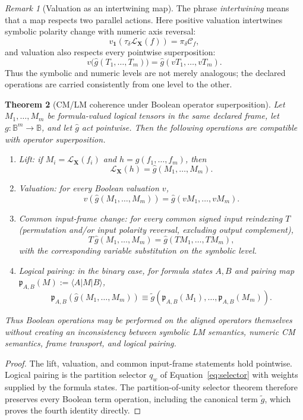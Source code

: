\documentclass[11pt]{article}
\newtheorem{theorem}{Theorem}[section]
\theoremstyle{definition}
\theoremstyle{remark}
\newtheorem{remark}[theorem]{Remark}
\newcommand{\B}{\mathbb B}
\newcommand{\cC}{\mathcal C}
\begin{document}
\begin{remark}[Valuation as an intertwining map]
The phrase \emph{intertwining} means that a map respects two parallel actions.  Here positive valuation intertwines symbolic polarity change with numeric axis reversal:
\[
 v_{\mathbf1}\!\left(\tau_\delta\mathcal L_{\mathbf X}(f)\right)
 =\pi_\delta\cC_f,
\]
and valuation also respects every pointwise superposition:
\[
 v\bigl(\widehat g(T_1,\ldots,T_m)\bigr)
 =\widehat g(vT_1,\ldots,vT_m).
\]
Thus the symbolic and numeric levels are not merely analogous; the declared operations are carried consistently from one level to the other.
\end{remark}

\begin{theorem}[CM/LM coherence under Boolean operator superposition]
\label{thm:coherence}
Let $M_1,\ldots,M_m$ be formula-valued logical tensors in the same declared frame, let $g:\B^m\to\B$, and let $\widehat g$ act pointwise.  Then the following operations are compatible with operator superposition.
\begin{enumerate}
\item \emph{Lift:} if $M_i=\mathcal L_{\mathbf X}(f_i)$ and $h=g(f_1,\ldots,f_m)$, then
\[
 \mathcal L_{\mathbf X}(h)=\widehat g(M_1,\ldots,M_m).
\]
\item \emph{Valuation:} for every Boolean valuation $v$,
\[
 v\!\left(\widehat g(M_1,\ldots,M_m)\right)
 =\widehat g(vM_1,\ldots,vM_m).
\]
\item \emph{Common input-frame change:} for every common signed input reindexing $T$ (permutation and/or input polarity reversal, excluding output complement),
\[
 T\,\widehat g(M_1,\ldots,M_m)
 =\widehat g(TM_1,\ldots,TM_m),
\]
with the corresponding variable substitution on the symbolic level.
\item \emph{Logical pairing:} in the binary case, for formula states $A,B$ and pairing map $\mathfrak p_{A,B}(M):=\langle A|M|B\rangle$,
\[
 \mathfrak p_{A,B}\!\left(\widehat g(M_1,\ldots,M_m)\right)
 \equiv
 \widetilde g\!\left(\mathfrak p_{A,B}(M_1),\ldots,\mathfrak p_{A,B}(M_m)\right).
\]
\end{enumerate}
Thus Boolean operations may be performed on the aligned operators themselves without creating an inconsistency between symbolic LM semantics, numeric CM semantics, frame transport, and logical pairing.
\end{theorem}
\begin{proof}
The lift, valuation, and common input-frame statements hold pointwise.  Logical pairing is the partition selector $q_w$ of Equation~\eqref{eq:selector} with weights supplied by the formula states.  The partition-of-unity selector theorem therefore preserves every Boolean term operation, including the canonical term $\widetilde g$, which proves the fourth identity directly.
\end{proof}
\end{document}
